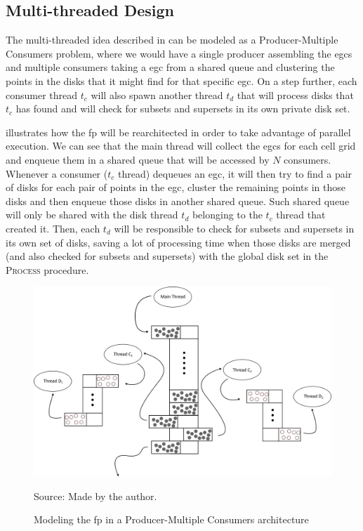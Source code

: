 \subsection{Multi-threaded Design}
\label{subsec:multithread}
The multi-threaded idea described in  can be modeled as a Producer-Multiple Consumers problem,
where we would have a single producer assembling the \ac{egc}s and multiple consumers taking a \ac{egc} from a shared
queue and clustering the points in the disks that it might find for that specific \ac{egc}. On a step further, each
consumer thread $t_c$ will also spawn another thread $t_d$ that will process disks that $t_c$ has found and will check
for subsets and supersets in its own private disk set.

 illustrates how the \ac{fp} will be rearchitected in order to take advantage of parallel
execution. We can see that the main thread will collect the \ac{egc}s for each cell grid and enqueue them in a shared
queue that will be accessed by $N$ consumers. Whenever a consumer ($t_c$ thread) dequeues an \ac{egc}, it will then try
to find a pair of disks for each pair of points in the \ac{egc}, cluster the remaining points in those disks and then
enqueue those disks in another shared queue. Such shared queue will only be shared with the disk thread $t_d$ belonging
to the $t_c$ thread that created it. Then, each $t_d$ will be responsible to check for subsets and supersets in its own
set of disks, saving a lot of processing time when those disks are merged (and also checked for subsets and supersets)
with the global disk set in the \textsc{Process} procedure.

\begin{figure}[t!]
    \centering
    \caption{Modeling the \ac{fp} in a Producer-Multiple Consumers architecture}
    \centerline{\includegraphics[width=\linewidth]{images/multithread.eps}}
    \footnotesize{Source: Made by the author.}
    \label{fig:multithread}
\end{figure}
